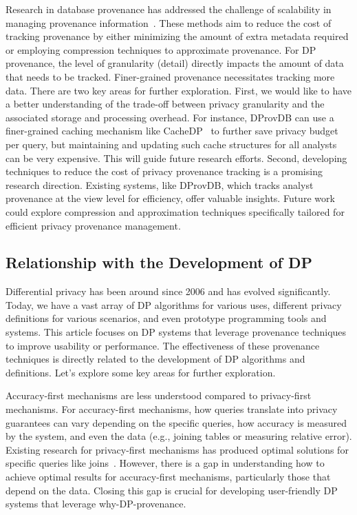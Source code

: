 Research in database provenance has addressed the challenge of scalability in managing provenance information~\cite{geerts2006mondrian,srivastava2007intensional,chapman2008efficient,re2008approximate}. These methods aim to reduce the cost of tracking provenance by either minimizing the amount of extra metadata required or employing compression techniques to approximate provenance. For DP provenance, the level of granularity (detail) directly impacts the amount of data that needs to be tracked. Finer-grained provenance necessitates tracking more data. There are two key areas for further exploration. First, we would like to have a better understanding of the trade-off between privacy granularity and the associated storage and processing overhead. For instance, DProvDB can use a finer-grained caching mechanism like CacheDP~\cite{mazmudar2022cache} to further save privacy budget per query, but maintaining and updating such cache structures for all analysts can be very expensive.
This will guide future research efforts. Second, developing techniques to reduce the cost of privacy provenance tracking is a promising research direction. Existing systems, like DProvDB, which tracks analyst provenance at the view level for efficiency, offer valuable insights. Future work could explore compression and approximation techniques specifically tailored for efficient privacy provenance management.


\subsection{Relationship with the Development of DP}

Differential privacy has been around since 2006 and has evolved significantly. Today, we have a vast array of DP algorithms for various uses, different privacy definitions for various scenarios, and even prototype programming tools and systems. This article focuses on DP systems that leverage provenance techniques to improve usability or performance. The effectiveness of these provenance techniques is directly related to the development of DP algorithms and definitions. Let's explore some key areas for further exploration.

Accuracy-first mechanisms are less understood compared to privacy-first mechanisms.  For accuracy-first mechanisms, how queries translate into privacy guarantees can vary depending on the specific queries, how accuracy is measured by the system, and even the data (e.g., joining tables or measuring relative error). Existing research for privacy-first mechanisms has produced optimal solutions for specific queries like joins~\cite{dong2022r2t,dong2021nearly,dong2021residual,XiaoBHG11relativeerror}. However, there is a gap in understanding how to achieve optimal results for accuracy-first mechanisms, particularly those that depend on the data.  Closing this gap is crucial for developing user-friendly DP systems that leverage why-DP-provenance. 

